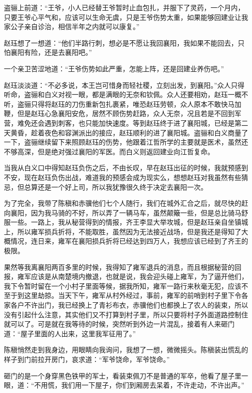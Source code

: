 盗骊上前道：“王爷，小人已经替王爷暂时止血包扎，并服下了灵药，一个月内，只要王爷心平气和，应该可以生命无虞，只是王爷伤势太重，如果能够回建业让我家公子亲自诊治，相信半年之内就可以康复。”

赵珏想了一想道：“他们半路行刺，想必是不愿让我回襄阳，我如果不能回去，只怕襄阳有险，还是去襄阳吧。”

一个亲卫苦涩地道：“王爷伤势如此严重，怎能上阵，还是回建业养伤吧。”

赵珏淡淡道：“不必多说，本王岂可惜身而轻社稷，立刻出发，到襄阳。”众人只得听命，盗骊和白义对视一眼，都是满眼的无奈和钦佩。众人还要相劝，赵珏一概不听，盗骊只得将赵珏的刀伤重新包扎裹紧，唯恐赵珏劳顿，众人原本不敢快马加鞭，但是赵珏心急襄阳安危，居然不顾伤势赶路，众人无奈，况且若是不回到军营，难免还会遇到刺客，也只能加快速度。等到赵珏终于进了襄阳城，已经是第二天黄昏，趁着夜色和容渊派出的接应，赵珏顺利的进了襄阳城。盗骊和白义商量了一下，盗骊继续留下来照顾赵珏的伤势，他跟着江哲所学的主要就是医术，虽然还不够高深，但是绝对强过襄阳的军医。而白义则返回建业向江哲复命。

当我从白义口中得知赵珏负伤之后，不由长叹，早在赵珏出征的时候，我就预感到不安，现在赵珏负伤出战，难道我的预感会成为现实么，想想赵珏对我虽然有些猜忌，但总算还是一个好上司，所以我犹豫很久终于决定去襄阳一次。

为了完全，我带了陈稹和赤骥他们七个人随行，我们在城外汇合之后，就尽快的赶向襄阳，因为我马骑的不好，所以弄了一辆马车，虽然颠簸一些，但是总比骑马舒服一些。一路上，我从秘营得到的情报，齐王李显大举攻城，但是赵珏亲自坐镇城上，所以雍军损兵折将，不能取胜，虽然因为无法接近战场，但是我还是得知了大概情况，连日来，雍军在襄阳损兵折将已经达到四万人，我想应该已经到了齐王的极限。

果然等我离襄阳两百多里的时候，我得知了雍军退兵的消息，而且根据秘营的回报，雍军应该是从南楚境内撤退，也就是说，我会迎头碰上雍军，为了逼开他们，我下令暂时留在一个小村子里面等候，据我所知，雍军一路行来秋毫无犯，应该不至于到这里劫掠。当天下午，雍军从村外经过，事前，雍军的前哨到村子里下令各家各户不许出门，我已经换上了青衫布衣，赤骥他们也都换上了农人的装束，所以没有引起什么注意，其实他们又不打算到村子里，所以只要将村子外面道路控制住就可以了。可是就在我等待的时候，突然听到外边一片混乱，接着有人来砸门道：“屋子里面的人出来，这里我军征用了。”

陈稹悄然走到我身边，用眼睛向我询问，我想了一想，微微摇头。陈稹装出慌乱的样子到门前拉开房门，哀求道：“军爷饶命，军爷饶命。”

砸门的是一个身穿黑色铁甲的军士，看装束佩刀不是普通的军卒，他看了屋子里一眼，道：“不用慌，我们用一下屋子，你们到厢房去呆着，不许走动，不许出声。”


